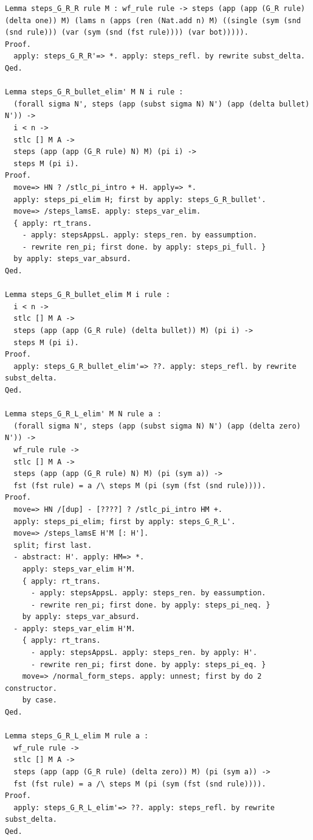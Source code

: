 \documentclass[10pt,a4paper]{amsart}
\begin{document}
\begin{lstlisting}
Lemma steps_G_R_R rule M : wf_rule rule -> steps (app (app (G_R rule) (delta one)) M) (lams n (apps (ren (Nat.add n) M) ((single (sym (snd (snd rule))) (var (sym (snd (fst rule)))) (var bot))))).
Proof.
  apply: steps_G_R_R'=> *. apply: steps_refl. by rewrite subst_delta.
Qed.

Lemma steps_G_R_bullet_elim' M N i rule :
  (forall sigma N', steps (app (subst sigma N) N') (app (delta bullet) N')) ->
  i < n ->
  stlc [] M A ->
  steps (app (app (G_R rule) N) M) (pi i) ->
  steps M (pi i).
Proof.
  move=> HN ? /stlc_pi_intro + H. apply=> *.
  apply: steps_pi_elim H; first by apply: steps_G_R_bullet'.
  move=> /steps_lamsE. apply: steps_var_elim.
  { apply: rt_trans.
    - apply: stepsAppsL. apply: steps_ren. by eassumption.
    - rewrite ren_pi; first done. by apply: steps_pi_full. }
  by apply: steps_var_absurd.
Qed.

Lemma steps_G_R_bullet_elim M i rule :
  i < n ->
  stlc [] M A ->
  steps (app (app (G_R rule) (delta bullet)) M) (pi i) ->
  steps M (pi i).
Proof.
  apply: steps_G_R_bullet_elim'=> ??. apply: steps_refl. by rewrite subst_delta.
Qed.

Lemma steps_G_R_L_elim' M N rule a :
  (forall sigma N', steps (app (subst sigma N) N') (app (delta zero) N')) ->
  wf_rule rule ->
  stlc [] M A ->
  steps (app (app (G_R rule) N) M) (pi (sym a)) ->
  fst (fst rule) = a /\ steps M (pi (sym (fst (snd rule)))).
Proof.
  move=> HN /[dup] - [????] ? /stlc_pi_intro HM +.
  apply: steps_pi_elim; first by apply: steps_G_R_L'.
  move=> /steps_lamsE H'M [: H'].
  split; first last.
  - abstract: H'. apply: HM=> *.
    apply: steps_var_elim H'M.
    { apply: rt_trans.
      - apply: stepsAppsL. apply: steps_ren. by eassumption.
      - rewrite ren_pi; first done. by apply: steps_pi_neq. }
    by apply: steps_var_absurd.
  - apply: steps_var_elim H'M.
    { apply: rt_trans.
      - apply: stepsAppsL. apply: steps_ren. by apply: H'.
      - rewrite ren_pi; first done. by apply: steps_pi_eq. }
    move=> /normal_form_steps. apply: unnest; first by do 2 constructor.
    by case.
Qed.

Lemma steps_G_R_L_elim M rule a :
  wf_rule rule ->
  stlc [] M A ->
  steps (app (app (G_R rule) (delta zero)) M) (pi (sym a)) ->
  fst (fst rule) = a /\ steps M (pi (sym (fst (snd rule)))).
Proof.
  apply: steps_G_R_L_elim'=> ??. apply: steps_refl. by rewrite subst_delta.
Qed.


\end{lstlisting}
\end{document}

